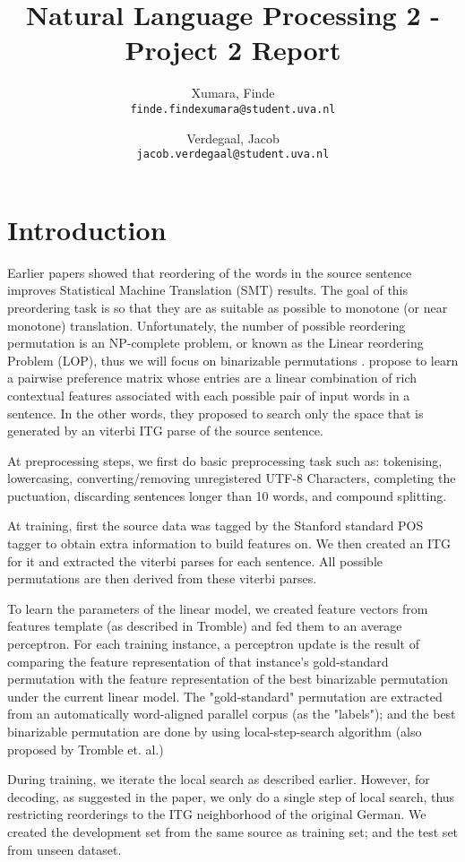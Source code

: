 \documentclass[11pt,DIV=11]{scrartcl}
\title{\small Natural Language Processing 2 - Project 2 Report \LARGE \\ \sc{\bf{Source Sentence Reordering for Better Translation}} }
\author{
    Xumara, Finde\\
    \texttt{finde.findexumara@student.uva.nl}
    \and
    Verdegaal, Jacob\\
    \texttt{jacob.verdegaal@student.uva.nl}
}
\begin{document}
\maketitle

\section{Introduction}
Earlier papers showed that reordering of the words in the source sentence improves Statistical Machine Translation (SMT) results. 
The goal of this preordering task is so that they are as suitable as possible to monotone (or near monotone) translation.
Unfortunately, the number of possible reordering permutation is an NP-complete problem, or known as the Linear reordering Problem (LOP), thus we will focus on binarizable permutations \cite{Wu1997}.
\cite{Tromble2009} propose to learn a pairwise preference matrix whose entries are a linear combination of rich contextual features associated with each possible pair of input words in a sentence. 
In the other words, they proposed to search only the space that is generated by an viterbi ITG parse of the source sentence.

At preprocessing steps, we first do basic preprocessing task such as: tokenising, lowercasing, converting/removing unregistered UTF-8 Characters, completing the puctuation, discarding sentences longer than 10 words, and compound splitting.

At training, first the source data was tagged by the Stanford standard POS tagger to obtain extra information to build features on.
We then created an ITG for it and extracted the viterbi parses for each sentence.
All possible permutations are then derived from these viterbi parses.

To learn the parameters of the linear model, we created feature vectors from features template (as described in Tromble) and fed them to an average perceptron.
For each training instance, a perceptron update is the result of comparing the feature representation of that instance’s gold-standard permutation with the feature representation of the best binarizable permutation under the current linear model.
The "gold-standard" permutation are extracted from an automatically word-aligned parallel corpus (as the "labels"); and the best binarizable permutation are done by using local-step-search algorithm (also proposed by Tromble et. al.)

During training, we iterate the local search as described earlier. 
However, for decoding, as suggested in the paper, we only do a single step of local search, thus restricting reorderings to the ITG neighborhood of the original German. 
We created the development set from the same source as training set; and the test set from unseen dataset.
\end{document}
